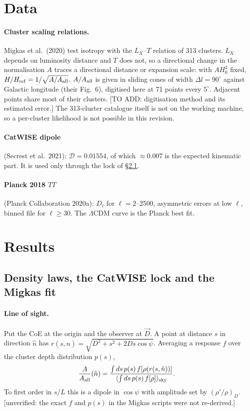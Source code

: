 \documentclass[11pt]{article}
\newcommand{\flag}[1]{\textsf{[unverified: #1]}}
\newcommand{\todo}[1]{\textsf{[#1]}}
\begin{document}
\section{Data}\label{sec:data}
\paragraph{Cluster scaling relations.} Migkas et al.\ (2020) test isotropy with the $L_X$--$T$ relation of 313 clusters. $L_X$ depends on luminosity distance and $T$ does not, so a directional change in the normalisation $A$ traces a directional distance or expansion scale: with $AH_0^2$ fixed, $H/H_{\rm ref}=1/\sqrt{A/A_{\rm all}}$. $A/A_{\rm all}$ is given in sliding cones of width $\Delta l=90^\circ$ against Galactic longitude (their Fig.~6), digitised here at 71 points every $5^\circ$. Adjacent points share most of their clusters. \todo{TO ADD: digitisation method and its estimated error.} The 313-cluster catalogue itself is not on the working machine, so a per-cluster likelihood is not possible in this revision.

\paragraph{CatWISE dipole} (Secrest et al.\ 2021): $\mathcal D=0.01554$, of which $\approx0.007$ is the expected kinematic part. It is used only through the lock of \S\ref{sec:laws}.

\paragraph{Planck 2018 $TT$} (Planck Collaboration 2020a): $D_\ell$ for $\ell=2$--2500, asymmetric errors at low $\ell$, binned file for $\ell\ge30$. The $\Lambda$CDM curve is the Planck best fit.



\section{Results}\label{sec:results}
\subsection{Density laws, the CatWISE lock and the Migkas fit}\label{sec:laws}
\paragraph{Line of sight.} Put the CoE at the origin and the observer at $\vec D$. A point at distance $s$ in direction $\hat n$ has $r(s,\hat n)=\sqrt{D^2+s^2+2Ds\cos\psi}$. Averaging a response $f$ over the cluster depth distribution $p(s)$,
\begin{equation}
\frac{A}{A_{\rm all}}(\hat n)=\frac{\int ds\,p(s)\,f[\rho(r(s,\hat n))]}{\langle\int ds\,p(s)\,f[\rho]\rangle_{\rm sky}}.\label{eq:los}
\end{equation}
To first order in $s/L$ this is a dipole in $\cos\psi$ with amplitude set by $(\rho'/\rho)_D$. \flag{the exact $f$ and $p(s)$ in the Migkas scripts were not re-derived.}
\end{document}
